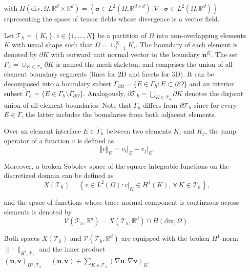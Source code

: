 \documentclass[english,11pt,3p,number,sort&compress]{elsarticle}
\newcommand{\jump}[1]
{
	\llbracket #1 \rrbracket
}
\begin{document}
\noindent with $H(\text{div},\Omega,\mathbb{R}^d \times \mathbb{R}^d) = \left\{\bm{\sigma} \in L^2(\Omega,\mathbb{R}^{d \times d}) : \nabla \cdot \bm{\sigma} \in L^2(\Omega,\mathbb{R}^d) \right\}$ representing the space of tensor fields whose divergence is a vector field.

Let $\mathcal{T}_h=\left\{K_i \right\}, i\in \{1,...,N\}$ be a partition of $\Omega$ into non-overlapping elements $K$ with usual shape such that $\Omega = \cup_{i=1}^{N} K_i$. The boundary of each element is denoted by $\partial K$ with outward unit normal vector to the boundary $\bm{n}^K$. The set $\Gamma_h=\cup_{K \in \mathcal{T}_h} \partial K$ is named the mesh skeleton, and comprises the union of all element boundary segments (lines for 2D and facets for 3D). It can be decomposed into a boundary subset $\Gamma_{\partial\Omega}=\{E \in \Gamma_h : E \subset \partial\Omega\}$ and an interior subset $\mathring{\Gamma}_h =\{E \in \Gamma_h \setminus \Gamma_{\partial\Omega}\}$. Analogously, $\partial\mathcal{T}_h=\bigcup_{K \in \mathcal{T}_h} \partial K$ denotes the disjoint union of all element boundaries. Note that $\Gamma_h$ differs from $\partial\mathcal{T}_h$ since for every $E \in \mathring{\Gamma}$, the latter includes the boundaries from both adjacent elements.

Over an element interface $E \in \mathring{\Gamma}_h$ between two elements $K_i$ and $K_j$, the jump operator of a function $v$ is defined as
\begin{equation*}
	\jump{v}_E = v_i \lvert_{E} - v_j \lvert_{E} \text{.}
\end{equation*}

Moreover, a broken Sobolev space of the square-integrable functions on the discretized domain can be defined as
\begin{equation*}
	X(\mathcal{T}_h) = \left\{v \in L^2(\Omega) : v \lvert_{K} \in H^1(K), \,\forall \, K\in\mathcal{T}_h \right\} ,
\end{equation*}

\noindent and the space of functions whose trace normal component is continuous across elements is denoted by
\begin{equation*}
	\mathcal{V}(\mathcal{T}_h,\mathbb{R}^d) = X(\mathcal{T}_h,\mathbb{R}^d) \cap H(\text{div},\Omega) .
\end{equation*}

\noindent Both spaces $X(\mathcal{T}_h)$ and $\mathcal{V}(\mathcal{T}_h,\mathbb{R}^d)$ are equipped with the broken $H^1$-norm $\| \cdot \|_{H^1,\mathcal{T}_h}$ and the inner product $(\bm{u},\bm{v})_{H^1,\mathcal{T}_h}=(\bm{u},\bm{v})+\sum_{K \in \mathcal{T}_h}(\nabla\bm{u},\nabla\bm{v})_K$.
\end{document}
